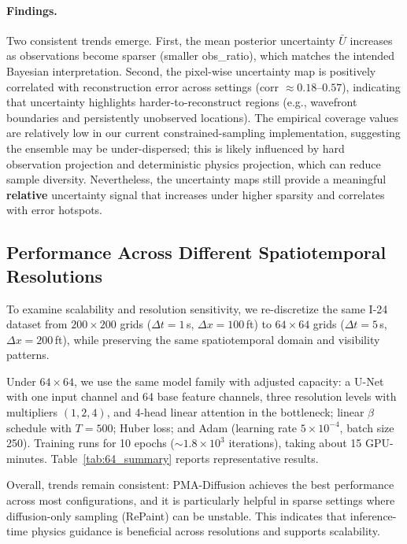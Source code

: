 \documentclass[a4paper,fleqn]{cas-sc}
\numberwithin{equation}{section}
\begin{document}
\paragraph{Findings.}
Two consistent trends emerge. First, the mean posterior uncertainty $\bar{U}$ increases as observations become sparser (smaller obs\_ratio), which matches the intended Bayesian interpretation. Second, the pixel-wise uncertainty map is positively correlated with reconstruction error across settings (corr $\approx 0.18$--$0.57$), indicating that uncertainty highlights harder-to-reconstruct regions (e.g., wavefront boundaries and persistently unobserved locations). The empirical coverage values are relatively low in our current constrained-sampling implementation, suggesting the ensemble may be under-dispersed; this is likely influenced by hard observation projection and deterministic physics projection, which can reduce sample diversity. Nevertheless, the uncertainty maps still provide a meaningful \textbf{relative} uncertainty signal that increases under higher sparsity and correlates with error hotspots.

\subsection{Performance Across Different Spatiotemporal Resolutions}
\label{sec:exp_resolution}

To examine scalability and resolution sensitivity, we re-discretize the same I-24 dataset from $200{\times}200$ grids ($\Delta t{=}1$\,s, $\Delta x{=}100$\,ft) to $64{\times}64$ grids ($\Delta t{=}5$\,s, $\Delta x{=}200$\,ft), while preserving the same spatiotemporal domain and visibility patterns.

Under $64{\times}64$, we use the same model family with adjusted capacity: a U-Net with one input channel and 64 base feature channels, three resolution levels with multipliers $(1,2,4)$, and 4-head linear attention in the bottleneck; linear $\beta$ schedule with $T=500$; Huber loss; and Adam (learning rate $5{\times}10^{-4}$, batch size 250). Training runs for 10 epochs ($\sim1.8\times10^3$ iterations), taking about 15 GPU-minutes. Table~\ref{tab:64_summary} reports representative results.

Overall, trends remain consistent: PMA-Diffusion achieves the best performance across most configurations, and it is particularly helpful in sparse settings where diffusion-only sampling (RePaint) can be unstable. This indicates that inference-time physics guidance is beneficial across resolutions and supports scalability.
\end{document}
